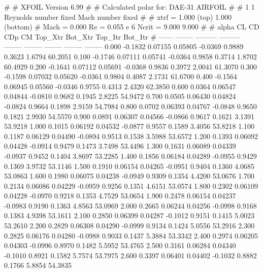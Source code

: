 #  
#       XFOIL         Version 6.99
#  
# Calculated polar for: DAE-31 AIRFOIL                                  
#  
# 1 1 Reynolds number fixed          Mach number fixed         
#  
# xtrf =   1.000 (top)        1.000 (bottom)  
# Mach =   0.000     Re =     0.055 e 6     Ncrit =   9.000  9.000
#  
#   alpha    CL        CD       CDp       CM     Top_Xtr  Bot_Xtr  Top_Itr  Bot_Itr
#  ------ -------- --------- --------- -------- -------- -------- -------- --------
   0.000  -0.1832   0.07155   0.05805  -0.0369   0.9889   0.3623   1.6794  60.2051
   0.100  -0.1746   0.07111   0.05741  -0.0364   0.9858   0.3714   1.8702  60.4929
   0.200  -0.1641   0.07112   0.05691  -0.0368   0.9836   0.3972   2.0041  61.3070
   0.300  -0.1598   0.07032   0.05620  -0.0361   0.9804   0.4087   2.1731  61.6700
   0.400  -0.1564   0.06945   0.05560  -0.0346   0.9755   0.4313   2.4320  62.3850
   0.600   0.0364   0.06547   0.04844  -0.0810   0.9682   0.1945   2.8225  54.9472
   0.700   0.0505   0.06430   0.04824  -0.0824   0.9664   0.1898   2.9159  54.7984
   0.800   0.0702   0.06393   0.04767  -0.0848   0.9650   0.1821   2.9930  54.5570
   0.900   0.0891   0.06307   0.04566  -0.0866   0.9617   0.1621   3.1391  53.9218
   1.000   0.1015   0.06192   0.04532  -0.0877   0.9557   0.1589   3.4056  53.8218
   1.100   0.1187   0.06129   0.04490  -0.0894   0.9513   0.1538   3.5988  53.6572
   1.200   0.1393   0.06092   0.04428  -0.0914   0.9479   0.1473   3.7498  53.4496
   1.300   0.1631   0.06089   0.04339  -0.0937   0.9452   0.1404   3.8697  53.2285
   1.400   0.1856   0.06184   0.04289  -0.0955   0.9429   0.1369   3.9732  53.1146
   1.500   0.1910   0.06154   0.04265  -0.0951   0.9404   0.1360   4.0685  53.0863
   1.600   0.1980   0.06075   0.04238  -0.0949   0.9309   0.1354   4.4200  53.0676
   1.700   0.2134   0.06086   0.04229  -0.0959   0.9256   0.1351   4.6151  53.0574
   1.800   0.2302   0.06109   0.04228  -0.0970   0.9218   0.1353   4.7529  53.0654
   1.900   0.2478   0.06154   0.04237  -0.0983   0.9190   0.1363   4.8563  53.0969
   2.000   0.2665   0.06244   0.04256  -0.0998   0.9168   0.1383   4.9398  53.1611
   2.100   0.2850   0.06399   0.04287  -0.1012   0.9151   0.1415   5.0023  53.2610
   2.200   0.2829   0.06308   0.04290  -0.0999   0.9134   0.1424   5.0556  53.2916
   2.300   0.2825   0.06176   0.04280  -0.0988   0.9033   0.1437   5.3884  53.3342
   2.400   0.2974   0.06205   0.04303  -0.0996   0.8970   0.1482   5.5952  53.4765
   2.500   0.3161   0.06284   0.04340  -0.1010   0.8921   0.1582   5.7574  53.7975
   2.600   0.3397   0.06401   0.04402  -0.1032   0.8882   0.1766   5.8854  54.3835
